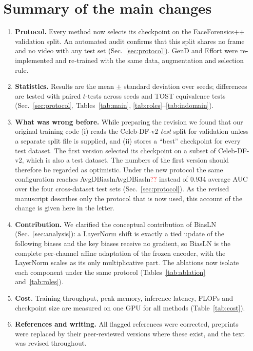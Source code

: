 \documentclass[11pt]{article}
\newcommand{\num}[1]{\ifcsname #1\endcsname\csname #1\endcsname\else\textcolor{red}{??}\fi}
\begin{document}
\section*{Summary of the main changes}
\begin{enumerate}
\item \textbf{Protocol.} Every method now selects its checkpoint on the FaceForensics++ validation split. An automated audit confirms that this split shares no frame and no video with any test set (Sec.~\ref{sec:protocol}). GenD and Effort were re-implemented and re-trained with the same data, augmentation and selection rule.
\item \textbf{Statistics.} Results are the mean $\pm$ standard deviation over seeds; differences are tested with paired $t$-tests across seeds and TOST equivalence tests (Sec.~\ref{sec:protocol}, Tables~\ref{tab:main}, \ref{tab:roles}--\ref{tab:indomain}).
\item \textbf{What was wrong before.} While preparing the revision we found that our original training code (i) reads the Celeb-DF-v2 \emph{test} split for validation unless a separate split file is supplied, and (ii) stores a ``best'' checkpoint for every test dataset. The first version selected its checkpoint on a subset of Celeb-DF-v2, which is also a test dataset. The numbers of the first version should therefore be regarded as optimistic. Under the new protocol the same configuration reaches \num{AvgDBiasln} instead of 0.934 average AUC over the four cross-dataset test sets (Sec.~\ref{sec:protocol}). As the revised manuscript describes only the protocol that is now used, this account of the change is given here in the letter.
\item \textbf{Contribution.} We clarified the conceptual contribution of BiasLN (Sec.~\ref{sec:analysis}): a LayerNorm shift is exactly a tied update of the following biases and the key biases receive no gradient, so BiasLN is the complete per-channel affine adaptation of the frozen encoder, with the LayerNorm scales as its only multiplicative part. The ablations now isolate each component under the same protocol (Tables~\ref{tab:ablation} and~\ref{tab:roles}).
\item \textbf{Cost.} Training throughput, peak memory, inference latency, FLOPs and checkpoint size are measured on one GPU for all methods (Table~\ref{tab:cost}).
\item \textbf{References and writing.} All flagged references were corrected, preprints were replaced by their peer-reviewed versions where these exist, and the text was revised throughout.
\end{enumerate}
\end{document}
